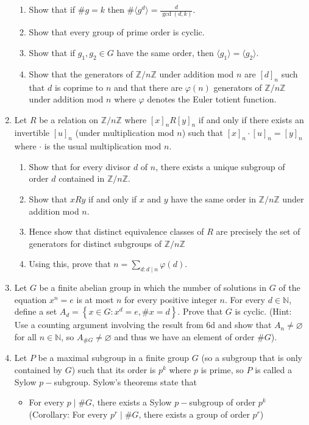 \documentclass[letterpaper,12pt]{article}
\newcommand{\set}[1]{\left\{ #1 \right\}}
\begin{document}
\begin{enumerate}
\begin{enumerate}
    \item Show that if $\# g = k$ then $\# \langle g^d \rangle = \frac{d}{\gcd(d,k)}$.
    \item Show that every group of prime order is cyclic.
    \item Show that if $g_1,g_2 \in G$ have the same order, then $\langle g_1 \rangle = \langle g_2 \rangle$.
    \item Show that the generators of $\mathbb{Z}/n\mathbb{Z}$ under addition mod $n$ are $[d]_n$ such that $d$ is coprime to $n$ and that there are $\varphi (n)$ generators of $\mathbb{Z}/n\mathbb{Z}$ under addition mod $n$ where $\varphi$ denotes the Euler totient function.
\end{enumerate}
\item Let $R$ be a relation on $\mathbb{Z}/n\mathbb{Z}$ where $[x]_n R [y]_n$ if and only if there exists an invertible $[u]_n$ (under multiplication mod $n$) such that $[x]_n\cdot[u]_n = [y]_n$ where $\cdot$ is the usual multiplication mod $n$.
\begin{enumerate}
    \item Show that for every divisor $d$ of $n$, there exists a unique subgroup of order $d$ contained in $\mathbb{Z}/n\mathbb{Z}$.
    \item Show that $xRy$ if and only if $x$ and $y$ have the same order in $\mathbb{Z}/n\mathbb{Z}$ under addition mod $n$.
    \item Hence show that distinct equivalence classes of $R$ are precisely the set of generators for distinct subgroups of $\mathbb{Z}/n\mathbb{Z}$
    \item Using this, prove that $n=\sum_{d:d\mid n}\varphi(d)$.
\end{enumerate}
\item Let $G$ be a finite abelian group in which the number of solutions in $G$ of the equation $x^n = e$ is at most $n$ for every positive integer $n$. For every $d \in \mathbb{N}$, define a set $A_d = \set{x\in G: x^d = e, \# x = d}$. Prove that $G$ is cyclic. (Hint: Use a counting argument involving the result from 6d and show that $A_n \neq \varnothing$ for all $n\in \mathbb{N}$, so $A_{\#G}\neq \varnothing$ and thus we have an element of order $\#G$).
\item Let $P$ be a maximal subgroup in a finite group $G$ (so a subgroup that is only contained by $G$) such that its order is $p^k$ where $p$ is prime, so $P$ is called a Sylow $p-$subgroup. Sylow's theorems state that \begin{itemize}
    \item For every $p \mid \# G$, there exists a Sylow $p-$subgroup of order $p^k$ (Corollary: For every $p^r \mid \#G$, there exists a group of order $p^r$)

\end{itemize}
\end{enumerate}
\end{document}
